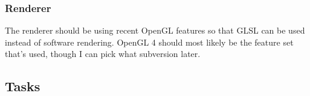 \documentclass[11pt]{article}
\begin{document}
\subsubsection{Renderer}
\label{sec:org21a872e}

The renderer should be using recent OpenGL features so that GLSL can be used instead of software
rendering.  OpenGL 4 should most  likely be the feature set that's used,  though I can pick what
subversion later.
\subsection{Tasks}
\label{sec:org48f7c57}
\end{document}
